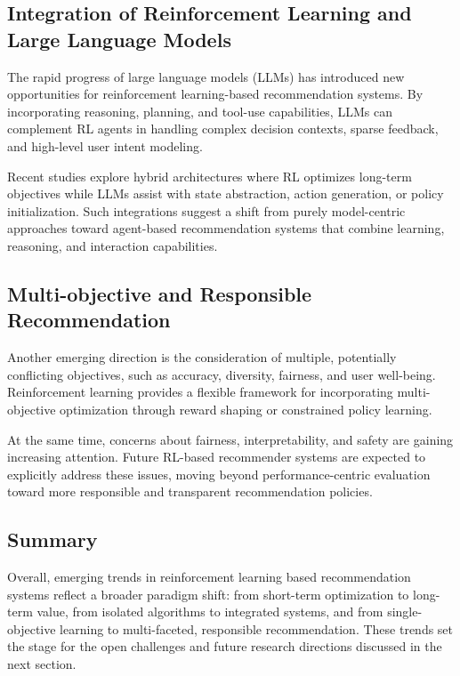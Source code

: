 \subsection{Integration of Reinforcement Learning and Large Language Models}

The rapid progress of large language models (LLMs) has introduced new opportunities for reinforcement learning-based recommendation systems. By incorporating reasoning, planning, and tool-use capabilities, LLMs can complement RL agents in handling complex decision contexts, sparse feedback, and high-level user intent modeling.

Recent studies explore hybrid architectures where RL optimizes long-term objectives while LLMs assist with state abstraction, action generation, or policy initialization. Such integrations suggest a shift from purely model-centric approaches toward agent-based recommendation systems that combine learning, reasoning, and interaction capabilities.

\subsection{Multi-objective and Responsible Recommendation}

Another emerging direction is the consideration of multiple, potentially conflicting objectives, such as accuracy, diversity, fairness, and user well-being. Reinforcement learning provides a flexible framework for incorporating multi-objective optimization through reward shaping or constrained policy learning.

At the same time, concerns about fairness, interpretability, and safety are gaining increasing attention. Future RL-based recommender systems are expected to explicitly address these issues, moving beyond performance-centric evaluation toward more responsible and transparent recommendation policies.

\subsection{Summary}

Overall, emerging trends in reinforcement learning based recommendation systems reflect a broader paradigm shift: from short-term optimization to long-term value, from isolated algorithms to integrated systems, and from single-objective learning to multi-faceted, responsible recommendation. These trends set the stage for the open challenges and future research directions discussed in the next section.
